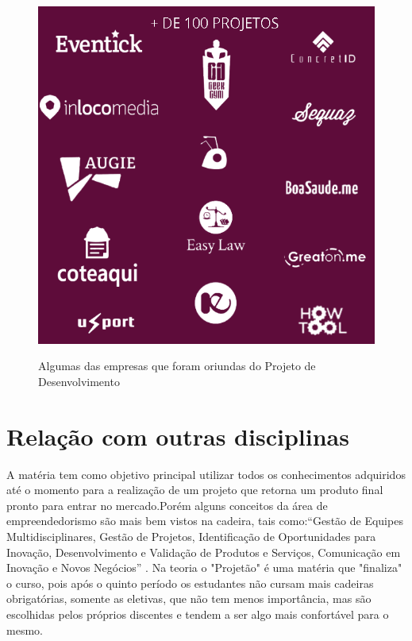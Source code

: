 \documentclass{paper}
\begin{document}
\begin{figure}[h!]
\centering
\includegraphics[scale=0.4]{EmpresasDoProjetao.PNG}
\caption{Algumas das empresas que foram oriundas do Projeto de Desenvolvimento}
\label{EmpresasDoProjetao}
\citep{sitProjetao}
\end{figure}

\section{Relação com outras disciplinas}
A matéria tem como objetivo principal utilizar todos os conhecimentos adquiridos até o momento para a realização de um projeto que retorna um produto final pronto para entrar no mercado.Porém alguns conceitos da área de empreendedorismo são mais bem vistos na cadeira, tais como:``Gestão de Equipes Multidisciplinares, Gestão de Projetos, Identificação de Oportunidades para Inovação, Desenvolvimento e Validação de Produtos e Serviços, Comunicação em Inovação e Novos Negócios''\citep{sitProjetao} . Na teoria o "Projetão" é uma matéria que "finaliza" o curso, pois após o quinto período os estudantes não cursam mais cadeiras obrigatórias, somente as eletivas, que não tem menos importância, mas são escolhidas pelos próprios discentes e tendem a ser algo mais confortável para o mesmo.



\end{document}
